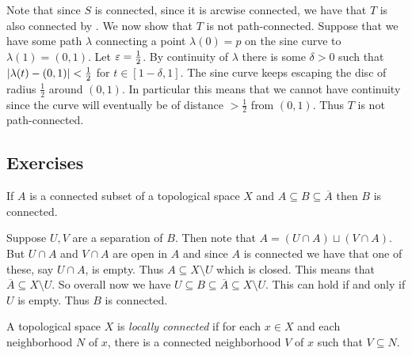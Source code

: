 \documentclass[letterpaper, 11pt, oneside]{book}
\begin{document}
\begin{ex}
\clearpage

  Note that since $S$ is connected, since it is arcwise connected, we have that $T$ is also connected by . We now show that $T$ is not path-connected.
  Suppose that we have some path $\lambda$ connecting a point $\lambda(0) = p$ on the sine curve to $\lambda(1) = (0, 1)$.
  Let $\varepsilon = \frac{1}{2}$.
  By continuity of $\lambda$ there is some $\delta > 0$ such that $\abs{\lambda(t) - (0, 1)} < \frac{1}{2}$ for $t \in [1 - \delta, 1]$.
  The sine curve keeps escaping the disc of radius $\frac{1}{2}$ around $(0, 1)$.
  In particular this means that we cannot have continuity since the curve will eventually be of distance $> \frac{1}{2}$ from $(0, 1)$.
  Thus $T$ is not path-connected.
\end{ex}

\clearpage

\subsection*{Exercises}

\begin{exercise}
  If $A$ is a connected subset of a topological space $X$ and $A \subseteq B \subseteq \overline{A}$ then $B$ is connected.
\end{exercise}
\begin{pf}
  Suppose $U, V$ are a separation of $B$.
  Then note that $A = (U \cap A) \sqcup (V \cap A)$.
  But $U \cap A$ and $V \cap A$ are open in $A$ and since $A$ is connected we have that one of these, say $U \cap A$, is empty.
  Thus $A \subseteq X \setminus U$ which is closed.
  This means that $\overline{A} \subseteq X \setminus U$.
  So overall now we have $U \subseteq B \subseteq \overline{A} \subseteq X \setminus U$.
  This can hold if and only if $U$ is empty.
  Thus $B$ is connected.
\end{pf}

\begin{defn}
  A topological space $X$ is \emph{locally connected} if for each $x \in X$ and each neighborhood $N$ of $x$, there is a connected neighborhood $V$ of $x$ such that $V \subseteq N$.
\end{defn}
\end{document}
